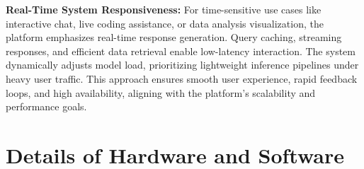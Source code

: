 \textbf{Real-Time System Responsiveness:} For time-sensitive use cases like interactive chat, live coding assistance, or data analysis visualization, the platform emphasizes real-time response generation. Query caching, streaming responses, and efficient data retrieval enable low-latency interaction. The system dynamically adjusts model load, prioritizing lightweight inference pipelines under heavy user traffic. This approach ensures smooth user experience, rapid feedback loops, and high availability, aligning with the platform’s scalability and performance goals.



\pagebreak

\section{Details of Hardware and Software}
